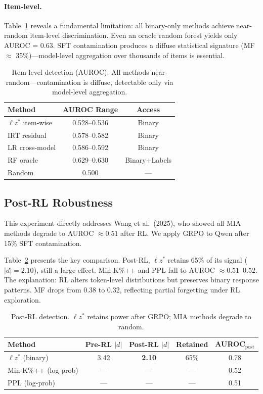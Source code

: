 \documentclass[11pt,a4paper]{article}
\begin{document}
\paragraph{Item-level.}
Table~\ref{tab:baselines_item} reveals a fundamental limitation: all binary-only methods achieve near-random item-level discrimination.
Even an oracle random forest yields only AUROC = 0.63.
SFT contamination produces a diffuse statistical signature (MF $\approx$ 35\%)---model-level aggregation over thousands of items is essential.

\begin{table}[h]
\centering
\small
\begin{tabular}{lcc}
\toprule
Method & AUROC Range & Access \\
\midrule
$\ell z^*$ item-wise & 0.528--0.536 & Binary \\
IRT residual & 0.578--0.582 & Binary \\
LR cross-model & 0.586--0.592 & Binary \\
RF oracle & 0.629--0.630 & Binary+Labels \\
Random & 0.500 & --- \\
\bottomrule
\end{tabular}
\caption{Item-level detection (AUROC). All methods near-random---contamination is diffuse, detectable only via model-level aggregation.}
\label{tab:baselines_item}
\end{table}

\subsection{Post-RL Robustness}
\label{sec:post_rl}

This experiment directly addresses Wang et al.\ (2025), who showed all MIA methods degrade to AUROC $\approx 0.51$ after RL.
We apply GRPO to Qwen after 15\% SFT contamination.

Table~\ref{tab:post_rl} presents the key comparison.
Post-RL, $\ell z^*$ retains 65\% of its signal ($|d| = 2.10$), still a large effect.
Min-K\%++ and PPL fall to AUROC $\approx 0.51$--$0.52$.
The explanation: RL alters token-level distributions but preserves binary response patterns.
MF drops from 0.38 to 0.32, reflecting partial forgetting under RL exploration.

\begin{table}[h]
\centering
\small
\begin{tabular}{lcccc}
\toprule
Method & Pre-RL $|d|$ & Post-RL $|d|$ & Retained & AUROC$_{\text{post}}$ \\
\midrule
$\ell z^*$ (binary) & 3.42 & \textbf{2.10} & 65\% & 0.78 \\
Min-K\%++ (log-prob) & --- & --- & --- & 0.52 \\
PPL (log-prob) & --- & --- & --- & 0.51 \\
\bottomrule
\end{tabular}
\caption{Post-RL detection. $\ell z^*$ retains power after GRPO; MIA methods degrade to random.}
\label{tab:post_rl}
\end{table}
\end{document}
